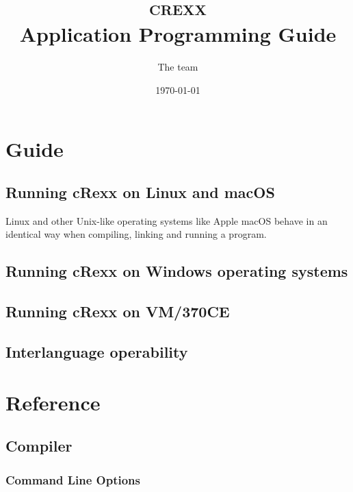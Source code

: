 


\renewcommand{\isbn}{978-90-819090-1-3}
\setcounter{tocdepth}{1}
\title{\textsc{crexx}\protect{}\\Application Programming Guide}

\author{The \crexx{} team}
\date{\null\hfill \today}
\maketitle
{}
\pagestyle{plain}
\frontmatter
{}
\pagestyle{plain}

\tableofcontents

\newpage
{}
\frontmatter
\large



\mainmatter

\part{Guide}
\chapter{Running cRexx on Linux and macOS}
Linux and other Unix-like operating systems like Apple macOS behave in
an identical way when compiling, linking and running a \crexx{}
program.

\chapter{Running cRexx on Windows operating systems}
\chapter{Running cRexx on VM/370CE}
\chapter{Interlanguage operability}
\part{Reference}
\chapter{\crexx{} Compiler}
\section{Command Line Options}
\begin{shaded}
  \small
  \obeylines {}
 \end{shaded}
